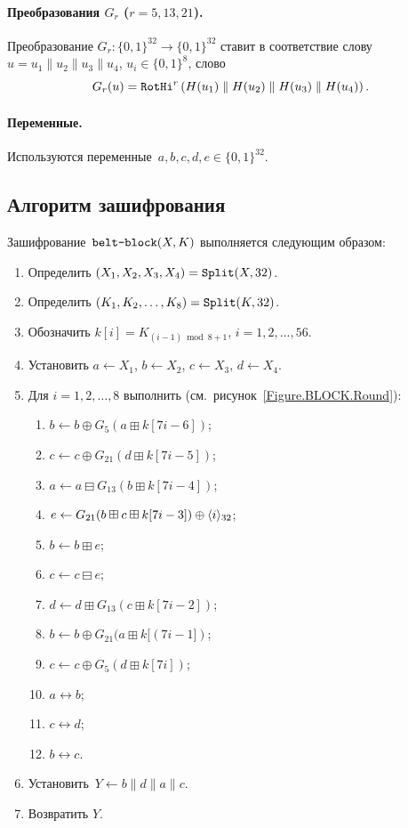 \paragraph{Преобразования $G_r$ ($r=5,13,21$).}
Преобразование $G_r\colon\{0,1\}^{32}\to\{0,1\}^{32}$
ставит в соответствие слову
$u=u_1\parallel u_2\parallel u_3\parallel u_4$,
$u_i\in\{0,1\}^8$,
слово
$$
G_r(u)=\mathop{\texttt{RotHi}}\nolimits^r\left(
H(u_1)\parallel H(u_2)\parallel H(u_3)\parallel H(u_4)
\right).
$$

\paragraph{Переменные.}
Используются переменные~$a,b,c,d,e\in\{0,1\}^{32}$.

\subsection{Алгоритм зашифрования}\label{BLOCK.Encr}

Зашифрование~$\texttt{belt-block}(X,K)$ выполняется следующим
образом: 
\begin{enumerate}
\item
Определить $(X_1,X_2,X_3,X_4)=\mathop{\texttt{Split}}\nolimits(X,32)$.
\item
Определить $(K_1,K_2,\ldots,K_8)=\mathop{\texttt{Split}}\nolimits(K,32)$.
\item
Обозначить $k[i]=K_{(i-1)\bmod 8 + 1}$, $i=1,2,\ldots,56$.
\item
Установить $a\leftarrow X_1$, $b\leftarrow X_2$, 
$c\leftarrow X_3$, $d\leftarrow X_4$.
\item
Для $i=1,2,\ldots,8$ выполнить (см.~рисунок~\ref{Figure.BLOCK.Round}):
\begin{enumerate}
\item
$b\leftarrow b\oplus G_{5}(a\boxplus k[7i-6])$;
\item
$c\leftarrow c\oplus G_{21}(d\boxplus k[7i-5])$;
\item
$a\leftarrow a\boxminus G_{13}(b\boxplus k[7i-4])$;
\item
$e\leftarrow G_{21}(b\boxplus c\boxplus k[7i-3])\oplus
\langle i\rangle_{32}$;
\item
$b\leftarrow b\boxplus  e$;
\item
$c\leftarrow c\boxminus e$;
\item
$d\leftarrow d\boxplus G_{13}(c\boxplus k[7i-2])$;
\item
$b\leftarrow b\oplus G_{21}(a\boxplus k[(7i-1])$;
\item
$c\leftarrow c\oplus G_{5}(d\boxplus k[7i])$;
\item
$a\leftrightarrow b$;
\item
$c\leftrightarrow d$;
\item
$b\leftrightarrow c$.
\end{enumerate}
\item
Установить~$Y\leftarrow b\parallel d\parallel a\parallel c$.
\item
Возвратить $Y$.
\end{enumerate}

